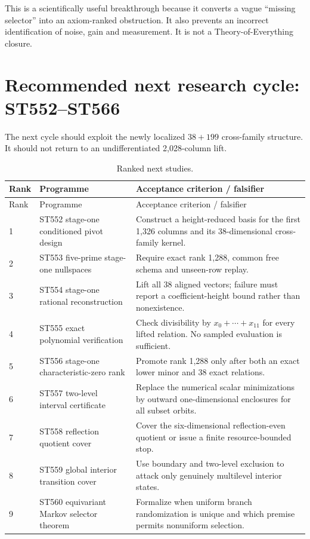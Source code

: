 \documentclass[11pt,a4paper]{article}
\theoremstyle{definition}\newtheorem{definition}[theorem]{Definition}
\theoremstyle{remark}\newtheorem{remark}[theorem]{Remark}
\begin{document}
This is a scientifically useful breakthrough because it converts a vague ``missing selector'' into an axiom-ranked obstruction. It also prevents an incorrect identification of noise, gain and measurement. It is not a Theory-of-Everything closure.

\section{Recommended next research cycle: ST552--ST566}

The next cycle should exploit the newly localized $38+199$ cross-family structure. It should not return to an undifferentiated 2,028-column lift.

\begin{longtable}{@{}p{}p{}p{}@{}}\caption{Ranked next studies.}\\\toprule Rank&Programme&Acceptance criterion / falsifier\\\midrule\endfirsthead\toprule Rank&Programme&Acceptance criterion / falsifier\\\midrule\endhead
1&ST552 stage-one conditioned pivot design&Construct a height-reduced basis for the first 1,326 columns and its 38-dimensional cross-family kernel.\\
2&ST553 five-prime stage-one nullspaces&Require exact rank 1,288, common free schema and unseen-row replay.\\
3&ST554 stage-one rational reconstruction&Lift all 38 aligned vectors; failure must report a coefficient-height bound rather than nonexistence.\\
4&ST555 exact polynomial verification&Check divisibility by $x_0+\cdots+x_{11}$ for every lifted relation. No sampled evaluation is sufficient.\\
5&ST556 stage-one characteristic-zero rank&Promote rank 1,288 only after both an exact lower minor and 38 exact relations.\\
6&ST557 two-level interval certificate&Replace the numerical scalar minimizations by outward one-dimensional enclosures for all subset orbits.\\
7&ST558 reflection quotient cover&Cover the six-dimensional reflection-even quotient or issue a finite resource-bounded stop.\\
8&ST559 global interior transition cover&Use boundary and two-level exclusion to attack only genuinely multilevel interior states.\\
9&ST560 equivariant Markov selector theorem&Formalize when uniform branch randomization is unique and which premise permits nonuniform selection.\\

\end{longtable}
\end{document}
